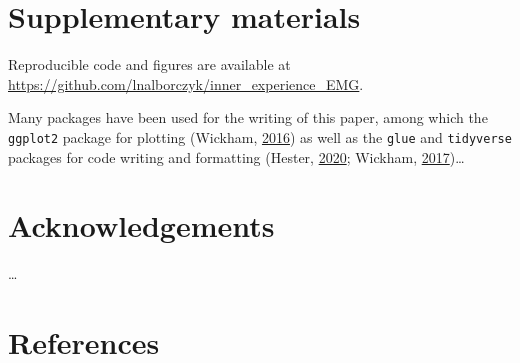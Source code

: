 \documentclass[
  english,
  man,floatsintext]{apa6}
\begin{document}
\hypertarget{supp}{%
\section{Supplementary materials}\label{supp}}

Reproducible code and figures are available at \url{https://github.com/lnalborczyk/inner_experience_EMG}.

Many packages have been used for the writing of this paper, among which the \texttt{ggplot2} package for plotting (Wickham, \protect\hyperlink{ref-R-ggplot2}{2016}) as well as the \texttt{glue} and \texttt{tidyverse} packages for code writing and formatting (Hester, \protect\hyperlink{ref-R-glue}{2020}; Wickham, \protect\hyperlink{ref-R-tidyverse}{2017})\ldots{}

\hypertarget{acknowledgements}{%
\section*{Acknowledgements}\label{acknowledgements}}

\ldots{}

\hypertarget{references}{%
\section*{References}\label{references}}
\end{document}
